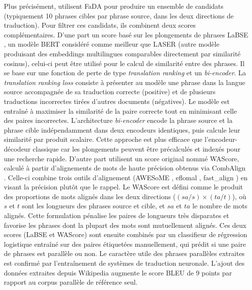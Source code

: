 Plus précisément, \citet{steingrimsson_2021} utilisent FaDA pour produire un ensemble de candidats
(typiquement 10 phrases cibles par phrase source, dans les deux directions de traduction). Pour filtrer ces candidats,
ils combinent deux scores complémentaires. D'une part un score basé sur les plongements de phrases LaBSE \citep{feng__2022},
un modèle BERT considéré comme meilleur que LASER \citep{artetxe_2019} (autre modèle produisant des
embeddings multilingues comparables directement par similarité cosinus), celui-ci peut être utilisé pour le
calcul de similarité entre des phrases. Il se base sur une fonction de perte de type \textit{translation ranking} et un
\textit{bi-encoder}. La \textit{translation ranking loss} consiste à présenter au modèle une phrase dans la langue source accompagnée de sa traduction correcte
(positive) et de plusieurs traductions incorrectes tirées d'autres documents (négatives). Le modèle est entraîné à maximiser la similarité
de la paire correcte tout en minimisant celle des paires incorrectes. L'architecture \textit{bi-encoder} encode la phrase source et
la phrase cible indépendamment dans deux encodeurs identiques, puis calcule leur similarité par produit scalaire. Cette approche est plus efficace que
l'encodeur-décodeur classique car les plongements peuvent être précalculés et indexés pour une recherche rapide.
D'autre part \citet{steingrimsson_2021} utilisent un score original nommé WAScore, calculé à partir d'alignements de mots de haute précision obtenus via
CombAlign \citep{steingrimsson_combalign_2021}. Celle-ci combine trois outils d'alignement (AWESoME \citep{dou_2021},
eflomal \citep{ostling_2016}, fast\_align \citep{dyer_2013}) en visant la précision plutôt que le rappel.
Le WAScore est défini comme le produit des proportions de mots alignés dans les deux directions (\( (sa/s) \times (ta/t) \)), où \(s\) et \(t\)
sont les longueurs des phrases source et cible, et \(sa\) et \(ta\) le nombre de mots alignés. Cette formulation pénalise les paires de longueurs
très disparates et favorise les phrases dont la plupart des mots sont mutuellement alignés. Ces deux scores (LaBSE \citep{feng__2022} et WAScore) sont ensuite
combinés par un classifieur de régression logistique entraîné sur des paires étiquetées manuellement, qui prédit si une paire de phrases est
parallèle ou non. Le caractère utile des phrases parallèles extraites est confirmé par l'entraînement de systèmes de traduction neuronale.
L'ajout des données extraites depuis Wikipedia augmente le score BLEU de 9 points par rapport au corpus
parallèle de référence seul.

